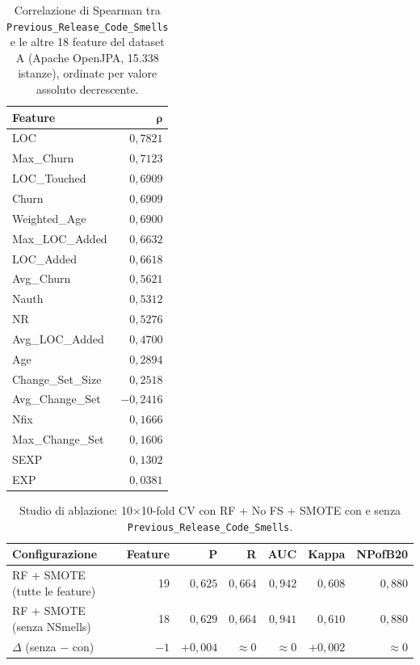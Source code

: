 \begin{table}[h]
\centering
\begin{tabular}{lr}
\toprule
\textbf{Feature} & $\boldsymbol{\rho}$ \\
\midrule
LOC               & $0{,}7821$ \\
Max\_Churn        & $0{,}7123$ \\
LOC\_Touched      & $0{,}6909$ \\
Churn             & $0{,}6909$ \\
Weighted\_Age     & $0{,}6900$ \\
Max\_LOC\_Added   & $0{,}6632$ \\
LOC\_Added        & $0{,}6618$ \\
Avg\_Churn        & $0{,}5621$ \\
Nauth             & $0{,}5312$ \\
NR                & $0{,}5276$ \\
Avg\_LOC\_Added   & $0{,}4700$ \\
Age               & $0{,}2894$ \\
Change\_Set\_Size & $0{,}2518$ \\
Avg\_Change\_Set  & $-0{,}2416$ \\
Nfix              & $0{,}1666$ \\
Max\_Change\_Set  & $0{,}1606$ \\
SEXP              & $0{,}1302$ \\
EXP               & $0{,}0381$ \\
\bottomrule
\end{tabular}
\caption{Correlazione di Spearman tra \texttt{Previous\_Release\_Code\_Smells} e le altre
         18 feature del dataset A (Apache OpenJPA, 15.338 istanze), ordinate per valore assoluto decrescente.}
\label{tab:r3-correlation}
\end{table}

\begin{table}[h]
\centering
\begin{tabular}{lrrrrrr}
\toprule
\textbf{Configurazione} & \textbf{Feature} & \textbf{P} & \textbf{R} & \textbf{AUC} & \textbf{Kappa} & \textbf{NPofB20} \\
\midrule
RF + SMOTE (tutte le feature) & 19 & $0{,}625$ & $0{,}664$ & $0{,}942$ & $0{,}608$ & $0{,}880$ \\
RF + SMOTE (senza NSmells)    & 18 & $0{,}629$ & $0{,}664$ & $0{,}941$ & $0{,}610$ & $0{,}880$ \\
\midrule
$\Delta$ (senza $-$ con)      & $-1$ & $+0{,}004$ & $\approx 0$ & $\approx 0$ & $+0{,}002$ & $\approx 0$ \\
\bottomrule
\end{tabular}
\caption{Studio di ablazione: 10$\times$10-fold CV con RF + No FS + SMOTE con e senza \texttt{Previous\_Release\_Code\_Smells}.}
\label{tab:r3-ablation}
\end{table}

